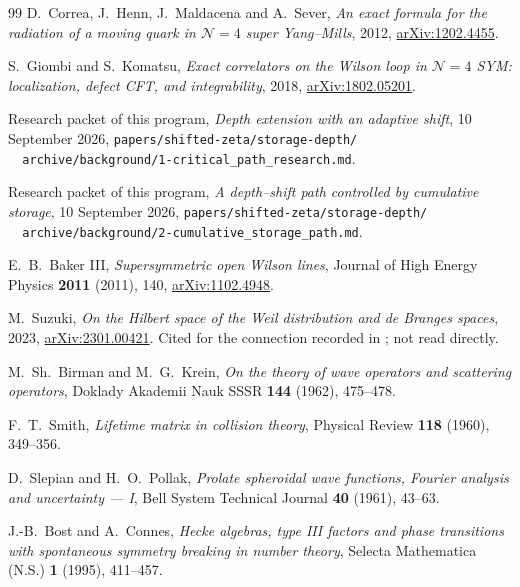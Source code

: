 \begin{thebibliography}{99}
D.~Correa, J.~Henn, J.~Maldacena and A.~Sever, \emph{An exact formula for the
radiation of a moving quark in $\mathcal N=4$ super Yang--Mills}, 2012,
\href{https://arxiv.org/abs/1202.4455}{arXiv:1202.4455}.

S.~Giombi and S.~Komatsu, \emph{Exact correlators on the Wilson loop in
$\mathcal N=4$ SYM: localization, defect CFT, and integrability}, 2018,
\href{https://arxiv.org/abs/1802.05201}{arXiv:1802.05201}.

Research packet of this program, \emph{Depth extension with an adaptive shift},
10 September 2026,
\texttt{papers/shifted-zeta/storage-depth/}\\
\texttt{\ \ archive/background/1-critical\_path\_research.md}.

Research packet of this program, \emph{A depth--shift path controlled by
cumulative storage}, 10 September 2026,
\texttt{papers/shifted-zeta/storage-depth/}\\
\texttt{\ \ archive/background/2-cumulative\_storage\_path.md}.

E.~B.~Baker III, \emph{Supersymmetric open Wilson lines}, Journal of High Energy
Physics \textbf{2011} (2011), 140,
\href{https://arxiv.org/abs/1102.4948}{arXiv:1102.4948}.

M.~Suzuki, \emph{On the Hilbert space of the Weil distribution and de Branges
spaces}, 2023, \href{https://arxiv.org/abs/2301.00421}{arXiv:2301.00421}.
Cited for the connection recorded in \cite{Selection}; not read directly.

M.~Sh.~Birman and M.~G.~Krein, \emph{On the theory of wave operators and
scattering operators}, Doklady Akademii Nauk SSSR \textbf{144} (1962), 475--478.

F.~T.~Smith, \emph{Lifetime matrix in collision theory}, Physical Review
\textbf{118} (1960), 349--356.

D.~Slepian and H.~O.~Pollak, \emph{Prolate spheroidal wave functions, Fourier
analysis and uncertainty --- I}, Bell System Technical Journal \textbf{40}
(1961), 43--63.

J.-B.~Bost and A.~Connes, \emph{Hecke algebras, type III factors and phase
transitions with spontaneous symmetry breaking in number theory}, Selecta
Mathematica (N.S.) \textbf{1} (1995), 411--457.
\end{thebibliography}
